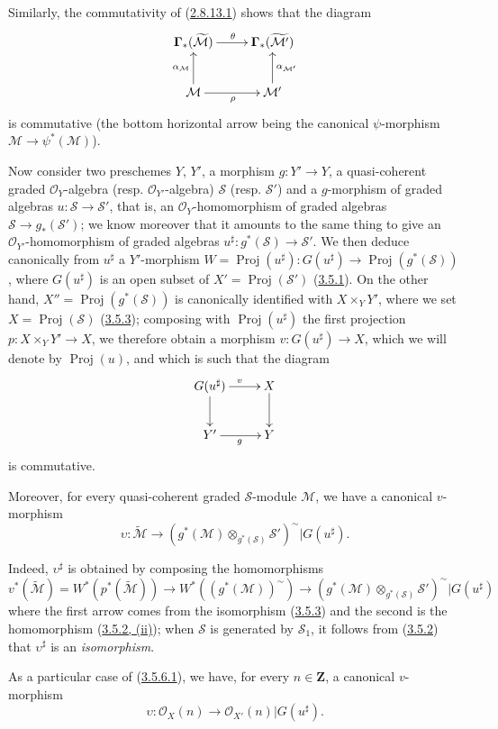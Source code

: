 \begin{env}[3.5.5]
Similarly, the commutativity of
(\hyperref[II.2.8.13.1]{2.8.13.1}) shows that the diagram
\[
  \xymatrix{
    \mathbf{\Gamma}_*(\widetilde{\mathcal{M}})\ar[r]^{\theta}
    & \mathbf{\Gamma}_*(\widetilde{\mathcal{M}'})\\
    \mathcal{M}\ar[r]_{\rho}\ar[u]^{\alpha_{\mathcal{M}}}
    & \mathcal{M}'\ar[u]_{\alpha_{\mathcal{M}'}}
  }
\]
is commutative (the bottom horizontal arrow being the canonical
$\psi$-morphism $\mathcal{M}\to\psi^*(\mathcal{M})$).
\end{env}

\begin{env}[3.5.6]
\label{II.3.5.6}
Now consider two preschemes $Y$, $Y'$, a morphism
$g:Y'\to Y$, a quasi-coherent graded $\mathcal{O}_Y$-algebra (resp.
$\mathcal{O}_{Y'}$-algebra) $\mathcal{S}$ (resp.
$\mathcal{S}'$) and a $g$-morphism of graded algebras
$u:\mathcal{S}\to\mathcal{S}'$, that is, an
$\mathcal{O}_Y$-homomorphism of graded algebras
$\mathcal{S}\to g_*(\mathcal{S}')$; we know moreover that it amounts to the
same thing to give an $\mathcal{O}_{Y'}$-homomorphism of graded algebras
$u^\sharp:g^*(\mathcal{S})\to\mathcal{S}'$. We then deduce canonically from
$u^\sharp$ a $Y'$-morphism
$W=\operatorname{Proj}(u^\sharp):G(u^\sharp)\to
\operatorname{Proj}(g^*(\mathcal{S}))$, where $G(u^\sharp)$ is an open subset
of $X'=\operatorname{Proj}(\mathcal{S}')$
(\hyperref[II.3.5.1]{3.5.1}). On the other hand,
$X''=\operatorname{Proj}(g^*(\mathcal{S}))$ is canonically identified
with $X\times_Y Y'$, where we set
$X=\operatorname{Proj}(\mathcal{S})$
(\hyperref[II.3.5.3]{3.5.3}); composing with
$\operatorname{Proj}(u^\sharp)$ the first projection
$p:X\times_Y Y'\to X$, we therefore obtain a morphism
$v:G(u^\sharp)\to X$, which we will denote by $\operatorname{Proj}(u)$, and
which is such that the diagram
\[
  \xymatrix{
    G(u^\sharp)\ar[r]^{v}\ar[d]
    & X\ar[d]\\
    Y'\ar[r]_{g}
    & Y
  }
\]
is commutative.

Moreover, for every quasi-coherent graded $\mathcal{S}$-module $\mathcal{M}$,
we have a canonical $v$-morphism
\[
\label{II.3.5.6.1}
  \upsilon:\widetilde{\mathcal{M}}\longrightarrow
  (g^*(\mathcal{M})\otimes_{g^*(\mathcal{S})}\mathcal{S}')^{\sim}
  |G(u^\sharp).
\tag{3.5.6.1}
\]

Indeed, $\upsilon^\sharp$ is obtained by composing the homomorphisms
\[
  v^*(\widetilde{\mathcal{M}})
  =W^*(p^*(\widetilde{\mathcal{M}}))
  \longrightarrow W^*((g^*(\mathcal{M}))^{\sim})
  \longrightarrow
  (g^*(\mathcal{M})\otimes_{g^*(\mathcal{S})}\mathcal{S}')^{\sim}
  |G(u^\sharp)
\]
where the first arrow comes from the isomorphism
(\hyperref[II.3.5.3]{3.5.3}) and the second is the homomorphism
(\hyperref[II.3.5.2]{3.5.2, (ii)}); when $\mathcal{S}$ is generated
by $\mathcal{S}_1$, it follows from (\hyperref[II.3.5.2]{3.5.2}) that
$\upsilon^\sharp$ is an \emph{isomorphism}.

As a particular case of (\hyperref[II.3.5.6.1]{3.5.6.1}), we have, for
every $n\in\mathbf{Z}$, a canonical $v$-morphism
\[
\label{II.3.5.6.2}
  \upsilon:\mathcal{O}_X(n)\longrightarrow
  \mathcal{O}_{X'}(n)|G(u^\sharp).
\tag{3.5.6.2}
\]
\end{env}

